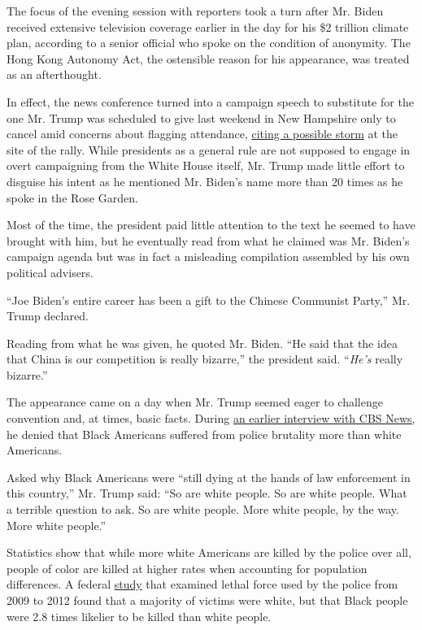 The focus of the evening session with reporters took a turn after Mr.
Biden received extensive television coverage earlier in the day for his
\$2 trillion climate plan, according to a senior official who spoke on
the condition of anonymity. The Hong Kong Autonomy Act, the ostensible
reason for his appearance, was treated as an afterthought.

In effect, the news conference turned into a campaign speech to
substitute for the one Mr. Trump was scheduled to give last weekend in
New Hampshire only to cancel amid concerns about flagging attendance,
\href{https://www.nytimes.com/2020/07/10/us/politics/trump-nh-rally-postponed.html}{citing
a possible storm} at the site of the rally. While presidents as a
general rule are not supposed to engage in overt campaigning from the
White House itself, Mr. Trump made little effort to disguise his intent
as he mentioned Mr. Biden's name more than 20 times as he spoke in the
Rose Garden.

Most of the time, the president paid little attention to the text he
seemed to have brought with him, but he eventually read from what he
claimed was Mr. Biden's campaign agenda but was in fact a misleading
compilation assembled by his own political advisers.

``Joe Biden's entire career has been a gift to the Chinese Communist
Party,'' Mr. Trump declared.

Reading from what he was given, he quoted Mr. Biden. ``He said that the
idea that China is our competition is really bizarre,'' the president
said. ``\emph{He's} really bizarre.''

The appearance came on a day when Mr. Trump seemed eager to challenge
convention and, at times, basic facts. During
\href{https://www.cbsnews.com/news/trump-black-americans-killed-police-white-too/}{an
earlier interview with CBS News,} he denied that Black Americans
suffered from police brutality more than white Americans.

Asked why Black Americans were ``still dying at the hands of law
enforcement in this country,'' Mr. Trump said: ``So are white people. So
are white people. What a terrible question to ask. So are white people.
More white people, by the way. More white people.''

Statistics show that while more white Americans are killed by the police
over all, people of color are killed at higher rates when accounting for
population differences. A federal
\href{https://www.ncbi.nlm.nih.gov/pmc/articles/PMC6080222/}{study} that
examined lethal force used by the police from 2009 to 2012 found that a
majority of victims were white, but that Black people were 2.8 times
likelier to be killed than white people.

